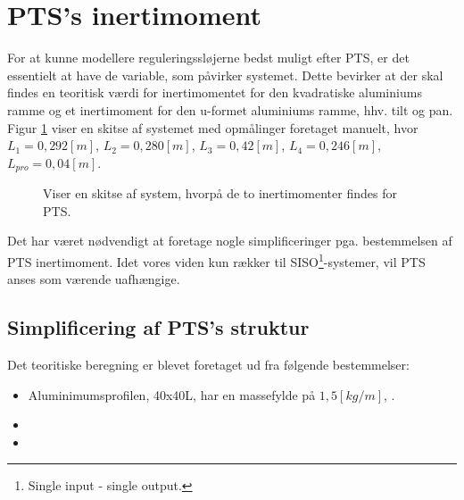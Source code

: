 \section{PTS's inertimoment}
\label{sec:teo_PTS}

For at kunne modellere reguleringssløjerne bedst muligt efter PTS, er det essentielt at have de variable, 
som påvirker systemet. Dette bevirker at der skal findes en teoritisk værdi for inertimomentet for den 
kvadratiske aluminiums ramme og et inertimoment for den u-formet aluminiums ramme, hhv. tilt og pan.\\

Figur \ref{fig:inerti_PTS} viser en skitse af systemet med opmålinger foretaget manuelt, hvor ${L_{1}} =0,292 [m]$,
${L_{2}} =0,280 [m]$, ${L_{3}}= 0,42 [m]$, ${L_{4}} =0,246 [m]$, ${L_{pro}}=0,04 [m]$.
\begin{figure}[!th]
\centering
\begin{tikzpicture}[scale=0.8]

\end{tikzpicture}
\caption[Skitse af PTS]{Viser en skitse af system, hvorpå de to inertimomenter findes for PTS.}
\label{fig:inerti_PTS}
\end{figure}

Det har været nødvendigt at foretage nogle simplificeringer pga. bestemmelsen af PTS inertimoment. 
Idet vores viden kun rækker til SISO\footnote{Single input - single output.}-systemer, vil PTS anses som værende uafhængige. 

\subsection{Simplificering af PTS's struktur}
Det teoritiske beregning er blevet foretaget ud fra følgende bestemmelser:

\begin{itemize}
\item Aluminimumsprofilen, 40x40L, har en massefylde på $1,5 [kg/m]$, \citep[Kap. 2 side. 4]{alu_profil_desitet}. 
\item 
\item 
\end{itemize}





